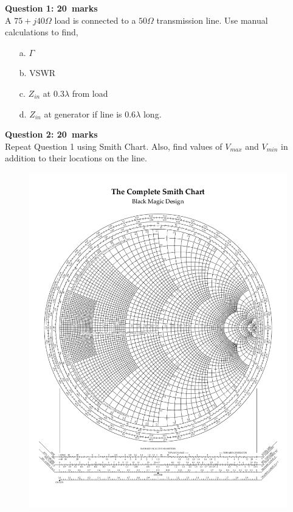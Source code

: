 \documentclass[12pt,a4paper]{article}
\def\Qone{20}
\def\Qtwo{20}
\begin{document}
\newpage
\pagestyle{fancy}
\noindent\textbf{Question 1: \hfill \Qone~marks}\\
A $75+j40\Omega$ load is connected to a $50\Omega$ transmission line. Use manual calculations to find,
\begin{itemize}
\item[a.] $\Gamma$
\item[b.] VSWR
\item[c.] $Z_{in}$ at $0.3\lambda$ from load
\item[d.] $Z_{in}$ at generator if line is $0.6\lambda$ long.
\end{itemize}
\newpage
\noindent \textbf{Question 2: \hfill \Qtwo~marks}\\
Repeat Question 1 using Smith Chart. Also, find values of $V_{max}$ and $V_{min}$ in addition to their locations on the line.
\newpage
\begin{figure}[H]
\centering
\vspace{4cm}
\hspace*{-1.6cm}
\includegraphics[scale=1.0,trim=1cm 2cm 1cm 3cm, clip]{./SmithChart}
\label{fig:SmithChart1}
\end{figure}
\end{document}
